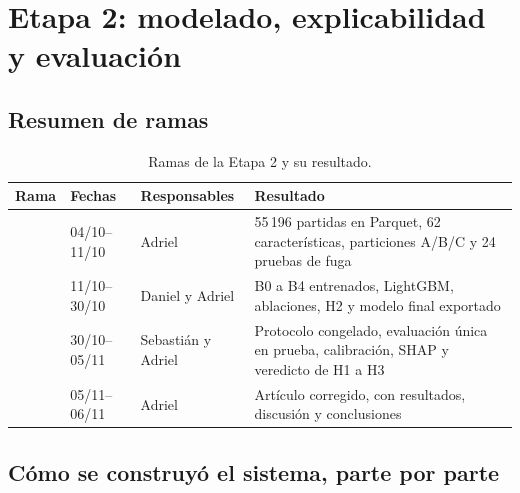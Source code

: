 \section{Etapa 2: modelado, explicabilidad y evaluaci\'on}
\label{sec:stage2}


\subsection{Resumen de ramas}

\begin{table}[H]
  \centering
  \caption{Ramas de la Etapa 2 y su resultado.}
  \label{tab:stage2summary}
  \footnotesize
  \begin{tabularx}{\textwidth}{@{}P{5.4cm} P{1.7cm} P{2.3cm} Y@{}}
    \toprule
    \textbf{Rama} & \textbf{Fechas} & \textbf{Responsables} & \textbf{Resultado}\\
    \midrule
    {\scriptsize{}} & 04/10--11/10 & Adriel & 55\,196 partidas en Parquet, 62 caracter\'isticas, particiones A/B/C y 24 pruebas de fuga\\
    {\scriptsize{}} & 11/10--30/10 & Daniel y Adriel & B0 a B4 entrenados, LightGBM, ablaciones, H2 y modelo final exportado\\
     & 30/10--05/11 & Sebasti\'an y Adriel & Protocolo congelado, evaluaci\'on \'unica en prueba, calibraci\'on, SHAP y veredicto de H1 a H3\\
     & 05/11--06/11 & Adriel & Art\'iculo corregido, con resultados, discusi\'on y conclusiones\\
    \bottomrule
  \end{tabularx}
\end{table}

\subsection{C\'omo se construy\'o el sistema, parte por parte}

